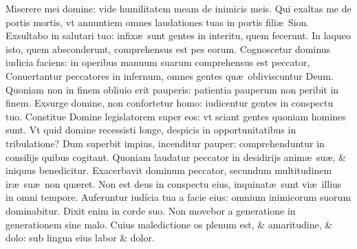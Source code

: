 \documentclass[a5paper,10pt]{book}
\def\ae{æ}
\begin{document}
\begin{multicols*}{2}
\newline \color{red} M\color{black}iserere mei domine: vide humilitatem meam de inimicis meis.
\newline \color{red} Q\color{black}ui exaltas me de portis mortis, vt annuntiem omnes laudationes tuas in portis fili\ae \ Sion.
\newline \color{red} E\color{black}xsultabo in salutari tuo: infix\ae \ sunt gentes in interitu, quem fecerunt.
\newline \color{red} I\color{black}n laqueo isto, quem absconderunt, comprehensus est pes eorum.
\newline \color{red} C\color{black}ognoscetur dominus iudicia faciens: in operibus manuum suarum comprehensus est peccator, %
\newline \color{red} C\color{black}onuertantur peccatores in infernum, omnes gentes qu\ae \ obliviscuntur Deum.
\newline \color{red} Q\color{black}uoniam non in finem obliuio erit pauperis: patientia pauperum non peribit in finem.
\newline \color{red} E\color{black}xsurge domine, non confortetur homo: iudicentur gentes in conspectu tuo.
\newline \color{red} C\color{black}onstitue Domine legislatorem super eos: vt sciant gentes quoniam homines sunt.
\newline \color{red} V\color{black}t quid domine recessisti longe, despicis in opportunitatibus in tribulatione?
\newline \color{red} D\color{black}um superbit impius, incenditur pauper: comprehenduntur in consilijs quibus cogitant.
\newline \color{red} Q\color{black}uoniam laudatur peccator in desidirijs anim\ae \ su\ae , \& iniquus benedicitur.
\newline \color{red} E\color{black}xacerbavit dominum peccator, secundum multitudinem ir\ae \ su\ae \ non qu\ae ret.
\newline \color{red} N\color{black}on est deus in conspectu eius, inquinat\ae \ sunt vi\ae \ illius in omni tempore.
\newline \color{red} A\color{black}uferuntur iudícia tua a facie eius: omnium inimicorum suorum dominabitur.
\newline \color{red} D\color{black}ixit enim in corde suo. Non movebor a generatione in generationem sine malo.
\newline \color{red} C\color{black}uius maledictione os plenum est, \& amaritudine, \& dolo: sub lingua eius labor \& dolor.

\end{multicols*}
\end{document}
